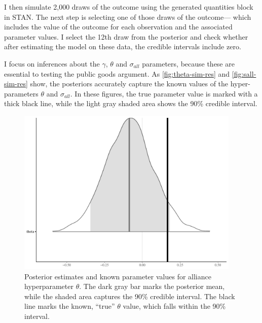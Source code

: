 \documentclass[12pt]{article}
\begin{document}
I then simulate 2,000 draws of the outcome using the generated quantities block in STAN. 
The next step is selecting one of those draws of the outcome--- which includes the value of the outcome for each observation and the associated parameter values. 
I select the 12th draw from the posterior and check whether after estimating the model on these data, the credible intervals include zero. 


I focus on inferences about the $\gamma$, $\theta$ and $\sigma_{all}$ parameters, because these are essential to testing the public goods argument. 
As \autoref{fig:theta-sim-res} and \autoref{fig:sall-sim-res} show, the posteriors accurately capture the known values of the hyper-parameters $\theta$ and $\sigma_{all}$. 
In these figures, the true parameter value is marked with a thick black line, while the light gray shaded area shows the 90\% credible interval. 


\begin{figure}[htbp]
	\centering
		\includegraphics[width=0.95\textwidth]{theta-sim-res.pdf}
	\caption{Posterior estimates and known parameter values for alliance hyperparameter $\theta$. The dark gray bar marks the posterior mean, while the shaded area captures the 90\% credible interval. The black line marks the known, ``true'' $\theta$ value, which falls within the 90\% interval.}
	\label{fig:theta-sim-res}
\end{figure}
\end{document}
